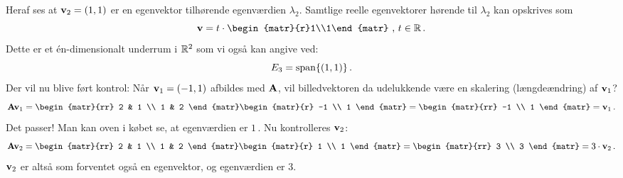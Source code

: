\begin{example}
Heraf ses at $ \mathbf{v}_2 = (1,1) $ er en egenvektor tilhørende egenværdien $ \lambda_2 $. Samtlige reelle egenvektorer hørende til $ \lambda_2 $ kan  opskrives som
\begin{equation}
\mv=t\cdot \begin{matr}{r}1\\1\end{matr}\,\,,\,t\in \reel\,.
\end{equation}
Dette er et én-dimensionalt underrum i $ \mathbb{R}^2 $ som vi også kan angive ved:
\begin{equation}
E_3=\mathrm{span}\{(1,1)\}\,.
\end{equation}
Der vil nu blive ført kontrol: Når $ \mathbf{v}_1=(-1,1) $ afbildes med $ \mathbf{A} $, vil billedvektoren da udelukkende være en skalering (længdeændring) af $ \mathbf{v}_1 $?
\begin{equation}
\mA \mv_1 = \begin{matr}{rr} 2 & 1 \\ 1 & 2 \end{matr} \begin{matr}{r} -1 \\ 1 \end{matr} =  \begin{matr}{rr} -1 \\ 1 \end{matr} = \mv_1 \, .
\end{equation}
Det passer! Man kan oven i købet se, at egenværdien er $1\,$. \bs
Nu kontrolleres $ \mathbf{v}_2 $:
\begin{equation}
\mA \mv_2 = \begin{matr}{rr} 2 & 1 \\ 1 & 2 \end{matr} \begin{matr}{r} 1 \\ 1 \end{matr} =  \begin{matr}{rr} 3 \\ 3 \end{matr} = 3 \cdot \mv_2 \, .
\end{equation}
$ \mathbf{v}_2 $ er altså som forventet også en egenvektor, og egenværdien er 3.
\end{example}

